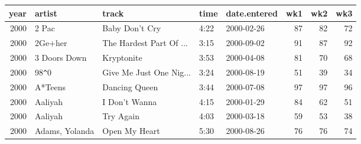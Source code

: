 \begin{tabular}{rllllrrr}
  \toprule
 year & artist & track & time & date.entered & wk1 & wk2 & wk3 \\ 
  \midrule
  2000 & 2 Pac & Baby Don't Cry & 4:22 & 2000-02-26 &  87 &  82 &  72 \\ 
  2000 & 2Ge+her & The Hardest Part Of ... & 3:15 & 2000-09-02 &  91 &  87 &  92 \\ 
  2000 & 3 Doors Down & Kryptonite & 3:53 & 2000-04-08 &  81 &  70 &  68 \\ 
  2000 & 98\verb|^|0 & Give Me Just One Nig... & 3:24 & 2000-08-19 &  51 &  39 &  34 \\ 
  2000 & A*Teens & Dancing Queen & 3:44 & 2000-07-08 &  97 &  97 &  96 \\ 
  2000 & Aaliyah & I Don't Wanna & 4:15 & 2000-01-29 &  84 &  62 &  51 \\ 
  2000 & Aaliyah & Try Again & 4:03 & 2000-03-18 &  59 &  53 &  38 \\ 
  2000 & Adams, Yolanda & Open My Heart & 5:30 & 2000-08-26 &  76 &  76 &  74 \\ 
   \bottomrule
\end{tabular}
